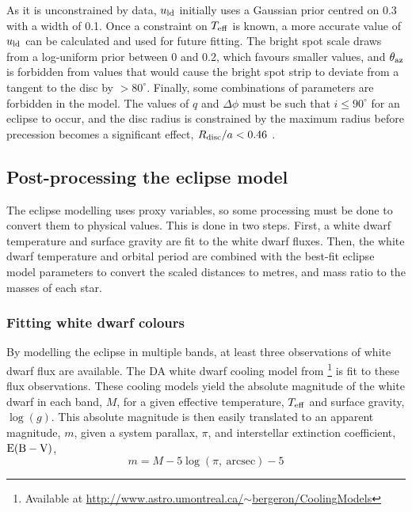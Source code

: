 As it is unconstrained by data, $u_{\rm ld}$ initially uses a Gaussian prior centred on 0.3 with a width of 0.1. Once a constraint on $T_{\rm eff}$ is known, a more accurate value of $u_{\rm ld}$ can be calculated and used for future fitting.
The bright spot scale draws from a log-uniform prior between 0 and 0.2, which favours smaller values, and $\theta_{\rm az}$ is forbidden from values that would cause the bright spot strip to deviate from a tangent to the disc by $>80^\circ$.
Finally, some combinations of parameters are forbidden in the model. The values of $q$ and $\Delta\phi$ must be such that $i \leq 90^\circ$ for an eclipse to occur, and the disc radius is constrained by the maximum radius before precession becomes a significant effect, $R_{\rm disc} / a < 0.46$ \citep{hellier2001}.


\subsection{Post-processing the eclipse model}
\label{sect:modelling:post processing the eclipse model}

The eclipse modelling uses proxy variables, so some processing must be done to convert them to physical values. This is done in two steps. First, a white dwarf temperature and surface gravity are fit to the white dwarf fluxes. Then, the white dwarf temperature and orbital period are combined with the best-fit eclipse model parameters to convert the scaled distances to metres, and mass ratio to the masses of each star.

\subsubsection{Fitting white dwarf colours}
\label{sect:modelling:fitting white dwarf colours}
By modelling the eclipse in multiple bands, at least three observations of white dwarf flux are available.
The DA white dwarf cooling model from \citet{Bergeron1995}\footnote{Available at \href{http://www.astro.umontreal.ca/~bergeron/CoolingModels}{http://www.astro.umontreal.ca/$\sim$bergeron/CoolingModels}} is fit to these flux observations.
These cooling models yield the absolute magnitude of the white dwarf in each band, $M$, for a given effective temperature, $T_{\rm eff}$ and surface gravity, $\log (g)$. This absolute magnitude is then easily translated to an apparent magnitude, $m$, given a system parallax, $\pi$, and interstellar extinction coefficient, ${\rm E(B-V)}$,
\begin{equation}
    m = M - 5\log (\pi\mathrm{,\ arcsec}) - 5
\end{equation}

